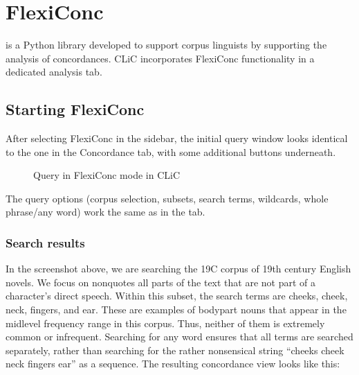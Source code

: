 \documentclass[letterpaper,10pt,english]{sphinxmanual}
\begin{document}
\sphinxstepscope


\chapter{FlexiConc}
\label{\detokenize{clicanalysis/flexiconc:flexiconc}}\label{\detokenize{clicanalysis/flexiconc:id1}}\label{\detokenize{clicanalysis/flexiconc::doc}}
\sphinxAtStartPar
{} is a Python library developed to support corpus linguists
by supporting the analysis of concordances. CLiC incorporates FlexiConc
functionality in a dedicated analysis tab.


\section{Starting FlexiConc}
\label{\detokenize{clicanalysis/flexiconc:starting-flexiconc}}
\sphinxAtStartPar
After selecting FlexiConc in the sidebar, the initial query window looks
identical to the one in the Concordance tab, with some additional buttons
underneath.

\begin{figure}[htbp]
\centering
\capstart

\noindent{}
\caption{Query in FlexiConc mode in CLiC}\label{\detokenize{clicanalysis/flexiconc:id2}}\label{\detokenize{clicanalysis/flexiconc:flexiclic-query}}\end{figure}

\sphinxAtStartPar
The query options (corpus selection, subsets, search terms, wildcards,
whole phrase/any word) work the same as in the {\hyperref[\detokenize{clicanalysis/concordance:concordance}]{}} tab.


\subsection{Search results}
\label{\detokenize{clicanalysis/flexiconc:search-results}}
\sphinxAtStartPar
In the screenshot above, we are searching the 19C corpus of 19th century
English novels. We focus on non\sphinxhyphen{}quotes \textendash{} all parts of the text that are
not part of a character’s direct speech. Within this subset, the search
terms are cheeks, cheek, neck, fingers, and ear. These are examples of
body\sphinxhyphen{}part nouns that appear in the mid\sphinxhyphen{}level frequency range in this
corpus. Thus, neither of them is extremely common or infrequent.
Searching for any word ensures that all terms are searched separately,
rather than searching for the rather nonsensical string “cheeks cheek
neck fingers ear” as a sequence. The resulting concordance view looks
like this:
\end{document}
